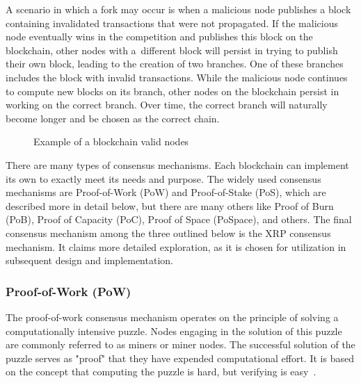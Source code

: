 A scenario in which a fork may occur is when a malicious node publishes a block containing invalidated transactions that were not propagated. If the malicious node eventually wins in the competition and publishes this block on the blockchain, other nodes with a~different block will persist in trying to publish their own block, leading to the creation of two branches. One of these branches includes the block with invalid transactions. While the malicious node continues to compute new blocks on its branch, other nodes on the blockchain persist in working on the correct branch. Over time, the correct branch will naturally become longer and be chosen as the correct chain.

\begin{figure}[h]
    \begin{center}
    \end{center}
    \caption{Example of a blockchain valid nodes}
    \label{figure:bc.valid.chain}
\end{figure}

There are many types of consensus mechanisms. Each blockchain can implement its own to exactly meet its needs and purpose. The widely used consensus mechanisms are Proof-of-Work (PoW) and Proof-of-Stake (PoS), which are described more in detail below, but there are many others like Proof of Burn (PoB), Proof of Capacity (PoC), Proof of Space (PoSpace), and others. The final consensus mechanism among the three outlined below is the XRP consensus mechanism. It claims more detailed exploration, as it is chosen for utilization in subsequent design and implementation.

\subsubsection{Proof-of-Work (PoW)}

The proof-of-work consensus mechanism operates on the principle of solving a computationally intensive puzzle. Nodes engaging in the solution of this puzzle are commonly referred to as miners or miner nodes. The successful solution of the puzzle serves as "proof" that they have expended computational effort. It is based on the concept that computing the puzzle is hard, but verifying is easy~\cite{bc.technology.overview}.

